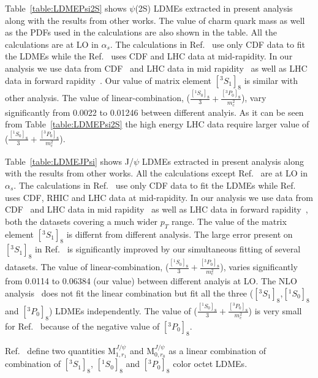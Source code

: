\documentclass[aps,prc,preprint,superscriptaddress,showpacs,showkeys,amsmath]{revtex4-1}
\begin{document}
{\color{blue}
Table~\ref{table:LDMEPsi2S} shows $\psi$(2S) LDMEs extracted in present analysis along with the results from other 
works. The value of charm quark mass as well as the PDFs used in the calculations are also shown in the table.
 All the calculations are at LO in $\alpha_{s}$. The calculations in Ref.~\cite{Cho:1995vh,Braaten:1999qk,Beneke:1996yw} use only 
CDF data to fit the LDMEs while the Ref.~\cite{Sharma:2012dy} uses CDF and LHC data at mid-rapidity. In our analysis we use data from
CDF~\cite{Abe:1997jz,Acosta:2004yw} and LHC data in mid rapidity~\cite{Chatrchyan:2011kc,Khachatryan:2015rra,Aad:2015duc} as well 
as LHC data in forward rapidity~\cite{Aaij:2012ag}. Our value of matrix element $[^3S_1]_{8}$ is 
similar with other analysis. The value of linear-combination, ($\frac{[^1S_{0}]_{8}}{3}+\frac{[^3P_0]_{8}}{m_{c}^2}$), vary significantly from 0.0022 to
0.01246 between different analyis. As it can be seen from Table~\ref{table:LDMEPsi2S} the high energy LHC data require larger value of
($\frac{[^1S_{0}]_{8}}{3}+\frac{[^3P_0]_{8}}{m_{c}^2}$).    


Table~\ref{table:LDMEJPsi} shows J/$\psi$ LDMEs extracted in present analysis along with the results from other 
works. All the calculations except Ref.~\cite{Butenschoen:2010rq} are at LO in $\alpha_{s}$. 
The calculations in Ref.~\cite{Cho:1995vh,Braaten:1999qk,Beneke:1996yw} 
use only CDF data to fit the LDMEs while Ref.~\cite{Sharma:2012dy} uses CDF, RHIC and LHC data at mid-rapidity. 
In our analysis we use data from CDF~\cite{Abe:1997jz,Acosta:2004yw} and LHC data in mid rapidity~\cite{Chatrchyan:2011kc,Khachatryan:2015rra,Aad:2015duc} 
as well as LHC data in forward rapidity~\cite{Aaij:2011jh,Aaij:2015rla}, both the datasets covering a much wider $p_T$ range.
The value of the matrix element $[^3S_1]_{8}$ is differnt from different analysis.
The large error present on $[^3S_1]_{8}$ in Ref.~\cite{Sharma:2012dy} is significantly improved by our 
simultaneous fitting of several datasets. The value of linear-combination, 
($\frac{[^1S_{0}]_{8}}{3}+\frac{[^3P_0]_{8}}{m_{c}^2}$), varies significantly from 0.0114 to 
0.06384 (our value) between different analyis at LO. The NLO analysis~\cite{Butenschoen:2010rq} does not fit the linear combination but
fit all the three ($[^3S_1]_{8}$,$[^1S_{0}]_{8}$ and $[^3P_0]_{8}$) LDMEs independently. The value of ($\frac{[^1S_{0}]_{8}}{3}+\frac{[^3P_0]_{8}}{m_{c}^2}$)
is very small for Ref.~\cite{Butenschoen:2010rq} because of the negative value of $[^3P_0]_{8}$.     

Ref.~\cite{Ma:2010jj} define two quantities M$^{J/\psi}_{1,r_{1}}$  and  M$^{J/\psi}_{0,r_{0}}$
as a linear combination of combination of $[^3S_1]_{8}$, $[^1S_0]_{8}$ and $[^3P_0]_{8}$
color octet LDMEs. 
  
}
\end{document}
